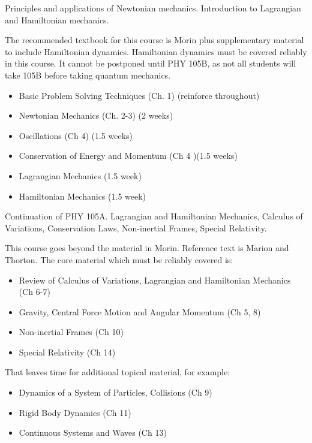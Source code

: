 \documentclass[12pt]{article}
\begin{document}
\vskip 1cm
Principles and applications of Newtonian mechanics. Introduction to
Lagrangian and Hamiltonian mechanics.

The recommended textbook for this course is Morin plus supplementary
material to include Hamiltonian dynamics.  Hamiltonian dynamics must
be covered reliably in this course.  It cannot be postponed until PHY
105B, as not all students will take 105B before taking quantum mechanics.
\begin{itemize}
 \item Basic Problem Solving Techniques (Ch. 1) (reinforce throughout)
 \item Newtonian Mechanics (Ch. 2-3) (2 weeks)
 \item Oscillations (Ch 4) (1.5 weeks)
 \item Conservation of Energy and Momentum (Ch 4 )(1.5 weeks)
 \item Lagrangian Mechanics (1.5 week)
 \item Hamiltonian Mechanics (1.5 week)
\end{itemize}
   
\vskip 1cm
Continuation of PHY 105A.  Lagrangian and Hamiltonian Mechanics,
Calculus of Variations, Conservation Laws, Non-inertial Frames,
Special Relativity.

This course goes beyond the material in Morin.  Reference text is
Marion and Thorton.  The core material which must be reliably covered
is:
\begin{itemize}
 \item Review of Calculus of Variations, Lagrangian and Hamiltonian Mechanics (Ch 6-7) 
 \item Gravity, Central Force Motion and Angular Momentum (Ch 5, 8)
 \item Non-inertial Frames (Ch 10) 
 \item Special Relativity (Ch 14)
\end{itemize}
That leaves time for additional topical material, for example:
\begin{itemize}
 \item Dynamics of a System of Particles, Collisions (Ch 9) 
 \item Rigid Body Dynamics (Ch 11)
 \item Continuous Systems and Waves (Ch 13)
\end{itemize}

\newpage
\end{document}
